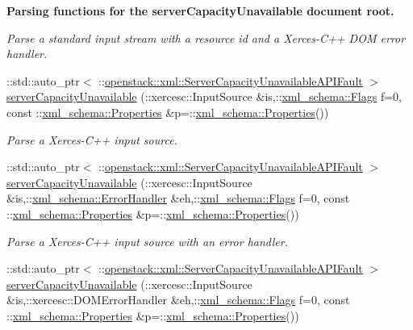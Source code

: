 \begin{Indent}{\bf Parsing functions for the serverCapacityUnavailable document root.}
\begin{DoxyCompactItemize}
\begin{DoxyCompactList}\small\item\em Parse a standard input stream with a resource id and a Xerces-\/C++ DOM error handler. \item\end{DoxyCompactList}\item 
::std::auto\_\-ptr$<$ ::\hyperlink{classopenstack_1_1xml_1_1ServerCapacityUnavailableAPIFault}{openstack::xml::ServerCapacityUnavailableAPIFault} $>$ \hyperlink{namespaceopenstack_1_1xml_a0827ece2ea9868953e77106271ec27f1}{serverCapacityUnavailable} (::xercesc::InputSource \&is,::\hyperlink{namespacexml__schema_affb4c227cbd9aa7453dd1dc5a1401943}{xml\_\-schema::Flags} f=0, const ::\hyperlink{namespacexml__schema_ad27ce19a7ee1d3b1064092648898f64c}{xml\_\-schema::Properties} \&p=::\hyperlink{namespacexml__schema_ad27ce19a7ee1d3b1064092648898f64c}{xml\_\-schema::Properties}())
\begin{DoxyCompactList}\small\item\em Parse a Xerces-\/C++ input source. \item\end{DoxyCompactList}\item 
::std::auto\_\-ptr$<$ ::\hyperlink{classopenstack_1_1xml_1_1ServerCapacityUnavailableAPIFault}{openstack::xml::ServerCapacityUnavailableAPIFault} $>$ \hyperlink{namespaceopenstack_1_1xml_aa3d9cd4f2db93ad32a5ad3c4f4f1d657}{serverCapacityUnavailable} (::xercesc::InputSource \&is,::\hyperlink{namespacexml__schema_ab1c9361bfd3b404eaabf0c31eded79dc}{xml\_\-schema::ErrorHandler} \&eh,::\hyperlink{namespacexml__schema_affb4c227cbd9aa7453dd1dc5a1401943}{xml\_\-schema::Flags} f=0, const ::\hyperlink{namespacexml__schema_ad27ce19a7ee1d3b1064092648898f64c}{xml\_\-schema::Properties} \&p=::\hyperlink{namespacexml__schema_ad27ce19a7ee1d3b1064092648898f64c}{xml\_\-schema::Properties}())
\begin{DoxyCompactList}\small\item\em Parse a Xerces-\/C++ input source with an error handler. \item\end{DoxyCompactList}\item 
::std::auto\_\-ptr$<$ ::\hyperlink{classopenstack_1_1xml_1_1ServerCapacityUnavailableAPIFault}{openstack::xml::ServerCapacityUnavailableAPIFault} $>$ \hyperlink{namespaceopenstack_1_1xml_a321e006cc218f98f68c7fbaa263bd878}{serverCapacityUnavailable} (::xercesc::InputSource \&is,::xercesc::DOMErrorHandler \&eh,::\hyperlink{namespacexml__schema_affb4c227cbd9aa7453dd1dc5a1401943}{xml\_\-schema::Flags} f=0, const ::\hyperlink{namespacexml__schema_ad27ce19a7ee1d3b1064092648898f64c}{xml\_\-schema::Properties} \&p=::\hyperlink{namespacexml__schema_ad27ce19a7ee1d3b1064092648898f64c}{xml\_\-schema::Properties}())

\end{DoxyCompactItemize}
\end{Indent}
